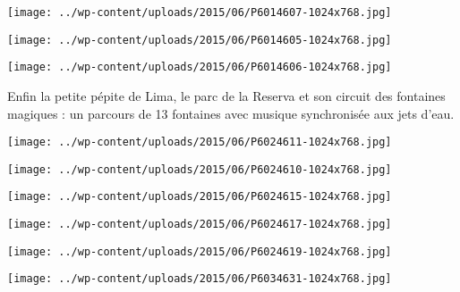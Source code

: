 \begin{center} \texttt{[image: ../wp-content/uploads/2015/06/P6014607-1024x768.jpg]} \end{center}

\begin{center} \texttt{[image: ../wp-content/uploads/2015/06/P6014605-1024x768.jpg]} \end{center}

\begin{center} \texttt{[image: ../wp-content/uploads/2015/06/P6014606-1024x768.jpg]} \end{center}

Enfin la petite pépite de Lima, le parc de la Reserva et son circuit des fontaines magiques : un parcours de 13 fontaines avec musique synchronisée aux jets d'eau. 

\begin{center} \texttt{[image: ../wp-content/uploads/2015/06/P6024611-1024x768.jpg]} \end{center}

\begin{center} \texttt{[image: ../wp-content/uploads/2015/06/P6024610-1024x768.jpg]} \end{center}

\begin{center} \texttt{[image: ../wp-content/uploads/2015/06/P6024615-1024x768.jpg]} \end{center}

\begin{center} \texttt{[image: ../wp-content/uploads/2015/06/P6024617-1024x768.jpg]} \end{center}

\begin{center} \texttt{[image: ../wp-content/uploads/2015/06/P6024619-1024x768.jpg]} \end{center}

\begin{center} \texttt{[image: ../wp-content/uploads/2015/06/P6034631-1024x768.jpg]} \end{center}